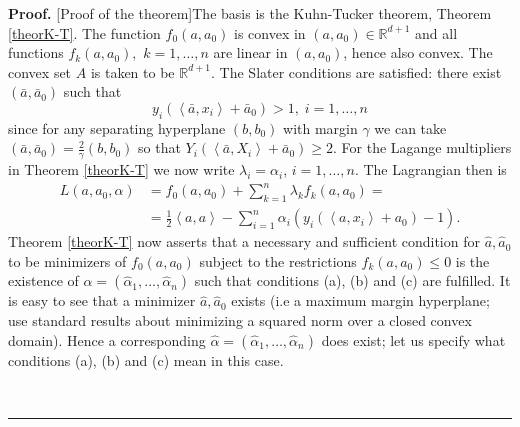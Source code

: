 \documentclass[11pt,twoside]{article}%
\theoremstyle{change}
\newenvironment{proof}[1][Proof]{\textbf{#1.} }{\ \rule{0.5em}{0.5em}}
\begin{document}
\begin{proof}
[Proof of the theorem]The basis is the Kuhn-Tucker theorem, Theorem
\ref{theorK-T}. The function $f_{0}(a,a_{0})$ is convex in $(a,a_{0}%
)\in\mathbb{R}^{d+1}$ and all functions $f_{k}(a,a_{0}),$ $k=1,\ldots,n$ are
linear in $(a,a_{0})$, hence also convex. The convex set $A$ is taken to be
$\mathbb{R}^{d+1}$. The Slater conditions are satisfied: there exist $(\bar
{a},\bar{a}_{0})$ such that
\[
y_{i}\left(  \left\langle \bar{a},x_{i}\right\rangle +\bar{a}_{0}\right)
>1,\;i=1,\ldots,n
\]
since for any separating hyperplane $(b,b_{0})$ with margin $\gamma$ we can
take $(\bar{a},\bar{a}_{0})=\frac{2}{\gamma}(b,b_{0})$ so that $Y_{i}\left(
\left\langle \bar{a},X_{i}\right\rangle +\bar{a}_{0}\right)  \geq2$. For the
Lagange multipliers in Theorem \ref{theorK-T} we now write $\lambda_{i}%
=\alpha_{i}$, $i=1,\ldots,n$. The Lagrangian then is
\begin{align*}
L\left(  a,a_{0},\alpha\right)   & =f_{0}(a,a_{0})+\sum_{k=1}^{n}\lambda
_{k}f_{k}(a,a_{0})=\\
& =\frac{1}{2}\left\langle a,a\right\rangle -\sum_{i=1}^{n}\alpha_{i}\left(
y_{i}\left(  \left\langle a,x_{i}\right\rangle +a_{0}\right)  -1\right)  .
\end{align*}
Theorem \ref{theorK-T} now asserts that a necessary and sufficient condition
for $\hat{a},\hat{a}_{0}$ to be minimizers of $f_{0}(a,a_{0})$ subject to the
restrictions $f_{k}(a,a_{0})\leq0$ is the existence of $\hat{\alpha}=\left(
\hat{\alpha}_{1},\ldots,\hat{\alpha}_{n}\right)  $ such that conditions (a),
(b) and (c) are fulfilled. It is easy to see that a minimizer $\hat{a},\hat
{a}_{0}$ exists (i.e a maximum margin hyperplane; use standard results about
minimizing a squared norm over a closed convex domain). Hence a corresponding
$\hat{\alpha}=\left(  \hat{\alpha}_{1},\ldots,\hat{\alpha}_{n}\right)  $ does
exist; let us specify what conditions (a), (b) and (c) mean in this case.


\end{proof}
\end{document}
